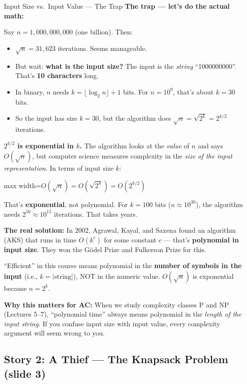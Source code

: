 \documentclass[11pt,a4paper]{article}
\newcommand{\fitmath}[1]{\begin{adjustbox}{max width=\linewidth}$\displaystyle #1$\end{adjustbox}}
\newcommand{\kt}[1]{\par\vspace{0.3em}\colorbox{yellow!60}{\parbox{\dimexpr\linewidth-2\fboxsep}{#1}}\vspace{0.3em}}
\begin{document}
\begin{conceptbox}{Input Size vs.\ Input Value --- The Trap}
\textbf{The trap --- let's do the actual math:}

Say $n = 1{,}000{,}000{,}000$ (one billion). Then:
\begin{itemize}[nosep]
\item $\sqrt{n} = 31{,}623$ iterations. Seems manageable.
\item But wait: \textbf{what is the input size?} The input is the \textit{string} ``1000000000''. That's \textbf{10 characters} long.
\item In binary, $n$ needs $k = \lfloor\log_2 n\rfloor + 1$ bits. For $n = 10^9$, that's about $k = 30$ bits.
\item So the input has size $k = 30$, but the algorithm does $\sqrt{n} = \sqrt{2^k} = 2^{k/2}$ iterations.
\end{itemize}

\textbf{$2^{k/2}$ is \textbf{exponential} in $k$.} The algorithm looks at the \textit{value} of $n$ and says $O(\sqrt{n})$, but computer science measures complexity in the \textit{size of the input representation}. In terms of input size $k$:

\fitmath{O(\sqrt{n}) = O(\sqrt{2^k}) = O(2^{k/2})}

That's \textbf{exponential}, not polynomial. For $k = 100$ bits ($n \approx 10^{30}$), the algorithm needs $2^{50} \approx 10^{15}$ iterations. That takes years.

\textbf{The real solution:} In 2002, Agrawal, Kayal, and Saxena found an algorithm (AKS) that runs in time $O(k^c)$ for some constant $c$ --- that's \textbf{polynomial in input size}. They won the G\"odel Prize and Fulkerson Prize for this.

\kt{``Efficient'' in this course means polynomial in the \textbf{number of symbols in the input} (i.e., $k = |\text{string}|$), NOT in the numeric value. $O(\sqrt{n})$ is exponential because $n = 2^k$.}
\end{conceptbox}

\textbf{Why this matters for AC:} When we study complexity classes P and NP (Lectures 5--7), ``polynomial time'' always means polynomial in the \textit{length of the input string}. If you confuse input size with input value, every complexity argument will seem wrong to you.

\subsection{Story 2: A Thief --- The Knapsack Problem (slide 3)}
\end{document}
